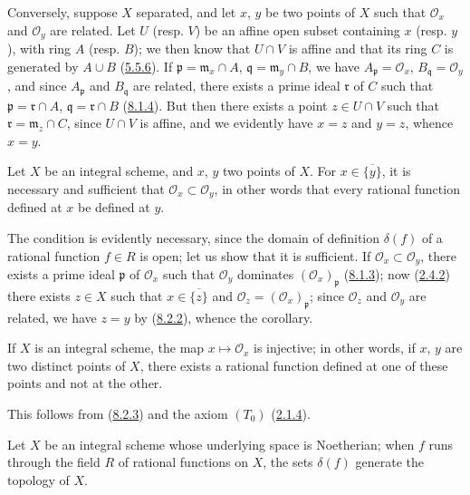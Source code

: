Conversely, suppose $X$ separated, and let $x$, $y$ be two points of $X$ such
that $\mathscr{O}_x$ and $\mathscr{O}_y$ are related. Let $U$ (resp.
$V$) be an affine open subset containing $x$ (resp. $y$), with ring $A$ (resp.
$B$); we then know that $U\cap V$ is affine and that its ring $C$ is generated
by $A\cup B$ (\hyperref[I.5.5.6]{5.5.6}). If
$\mathfrak p=\mathfrak m_x\cap A$, $\mathfrak q=\mathfrak m_y\cap B$, we have
$A_\mathfrak p=\mathscr{O}_x$, $B_\mathfrak q=\mathscr{O}_y$, and since
$A_\mathfrak p$ and $B_\mathfrak q$ are related, there exists a prime ideal
$\mathfrak r$ of $C$ such that $\mathfrak p=\mathfrak r\cap A$,
$\mathfrak q=\mathfrak r\cap B$ (\hyperref[I.8.1.4]{8.1.4}). But then
there exists a point $z\in U\cap V$ such that
$\mathfrak r=\mathfrak m_z\cap C$, since $U\cap V$ is affine, and we
evidently have $x=z$ and $y=z$, whence $x=y$.

\begin{corollary}[8.2.3]
\label{I.8.2.3}
Let $X$ be an integral scheme, and $x$, $y$ two points of $X$. For
$x\in\overline{\{y\}}$, it is necessary and sufficient that
$\mathscr{O}_x\subset\mathscr{O}_y$, in other words that every rational
function defined at $x$ be defined at $y$.
\end{corollary}

The condition is evidently necessary, since the domain of definition
$\delta(f)$ of a rational function $f\in R$ is open; let us show that it is
sufficient. If $\mathscr{O}_x\subset\mathscr{O}_y$, there exists a prime
ideal $\mathfrak p$ of $\mathscr{O}_x$ such that $\mathscr{O}_y$ dominates
$(\mathscr{O}_x)_\mathfrak p$ (\hyperref[I.8.1.3]{8.1.3}); now
(\hyperref[I.2.4.2]{2.4.2}) there exists $z\in X$ such that
$x\in\overline{\{z\}}$ and
$\mathscr{O}_z=(\mathscr{O}_x)_\mathfrak p$; since $\mathscr{O}_z$ and
$\mathscr{O}_y$ are related, we have $z=y$ by
(\hyperref[I.8.2.2]{8.2.2}), whence the corollary.

\begin{corollary}[8.2.4]
\label{I.8.2.4}
If $X$ is an integral scheme, the map $x\mapsto\mathscr{O}_x$ is
injective; in other words, if $x$, $y$ are two distinct points of $X$, there
exists a rational function defined at one of these points and not at the
other.
\end{corollary}

This follows from (\hyperref[I.8.2.3]{8.2.3}) and the axiom
$(T_0)$ (\hyperref[I.2.1.4]{2.1.4}).

\begin{corollary}[8.2.5]
\label{I.8.2.5}
Let $X$ be an integral scheme whose underlying space is Noetherian; when $f$
runs through the field $R$ of rational functions on $X$, the sets
$\delta(f)$ generate the topology of $X$.
\end{corollary}

